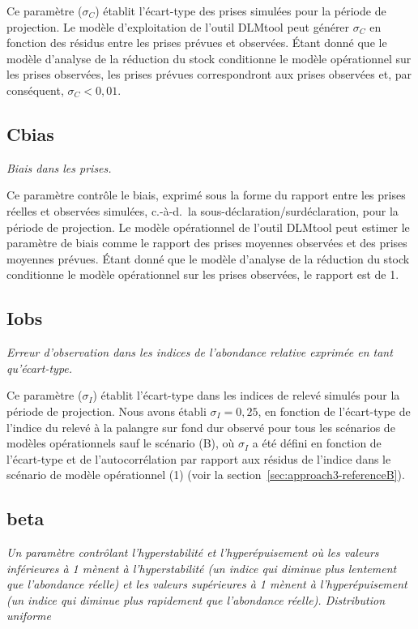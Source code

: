 \documentclass[11pt]{book}
\begin{document}
Ce paramètre (\(\sigma_C\)) établit l'écart-type des prises simulées pour la période de projection. Le modèle d'exploitation de l'outil DLMtool peut générer \(\sigma_C\) en fonction des résidus entre les prises prévues et observées. Étant donné que le modèle d'analyse de la réduction du stock conditionne le modèle opérationnel sur les prises observées, les prises prévues correspondront aux prises observées et, par conséquent, \(\sigma_C < 0,01\).

\label{app:desc-obs-cbias-yelloweye}
\subsection{Cbias}

\emph{Biais dans les prises.}

Ce paramètre contrôle le biais, exprimé sous la forme du rapport entre les prises réelles et observées simulées, c.-à-d.~la sous-déclaration/surdéclaration, pour la période de projection. Le modèle opérationnel de l'outil DLMtool peut estimer le paramètre de biais comme le rapport des prises moyennes observées et des prises moyennes prévues. Étant donné que le modèle d'analyse de la réduction du stock conditionne le modèle opérationnel sur les prises observées, le rapport est de 1.

\label{app:desc-obs-iobs-yelloweye}
\subsection{Iobs}

\emph{Erreur d'observation dans les indices de l'abondance relative exprimée en tant qu'écart-type.}

Ce paramètre (\(\sigma_I\)) établit l'écart-type dans les indices de relevé simulés pour la période de projection. Nous avons établi \(\sigma_I = 0,25\), en fonction de l'écart-type de l'indice du relevé à la palangre sur fond dur observé pour tous les scénarios de modèles opérationnels sauf le scénario (B), où \(\sigma_I\) a été défini en fonction de l'écart-type et de l'autocorrélation par rapport aux résidus de l'indice dans le scénario de modèle opérationnel (1) (voir la section~\ref{sec:approach3-referenceB}).

\label{app:desc-obs-beta-yelloweye}
\subsection{beta}

\emph{Un paramètre contrôlant l'hyperstabilité et l'hyperépuisement où les valeurs inférieures à 1 mènent à l'hyperstabilité (un indice qui diminue plus lentement que l'abondance réelle) et les valeurs supérieures à 1 mènent à l'hyperépuisement (un indice qui diminue plus rapidement que l'abondance réelle). Distribution uniforme}
\end{document}
